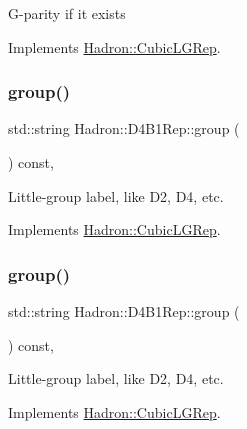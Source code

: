 G-\/parity if it exists 

Implements \mbox{\hyperlink{structHadron_1_1CubicLGRep_ace26f7b2d55e3a668a14cb9026da5231}{Hadron\+::\+Cubic\+L\+G\+Rep}}.

\mbox{\label{structHadron_1_1D4B1Rep_a030bc1e51b0cc790000a6ce72d132d06}} 
\subsubsection{\texorpdfstring{group()}{group()}\hspace{0.1cm}{\footnotesize\ttfamily [1/5]}}
{\footnotesize\ttfamily std\+::string Hadron\+::\+D4\+B1\+Rep\+::group (\begin{DoxyParamCaption}{ }\end{DoxyParamCaption}) const\hspace{0.3cm}{\ttfamily [inline]}, {\ttfamily [virtual]}}

Little-\/group label, like D2, D4, etc. 

Implements \mbox{\hyperlink{structHadron_1_1CubicLGRep_a9bdb14b519a611d21379ed96a3a9eb41}{Hadron\+::\+Cubic\+L\+G\+Rep}}.

\mbox{\label{structHadron_1_1D4B1Rep_a030bc1e51b0cc790000a6ce72d132d06}} 
\subsubsection{\texorpdfstring{group()}{group()}\hspace{0.1cm}{\footnotesize\ttfamily [2/5]}}
{\footnotesize\ttfamily std\+::string Hadron\+::\+D4\+B1\+Rep\+::group (\begin{DoxyParamCaption}{ }\end{DoxyParamCaption}) const\hspace{0.3cm}{\ttfamily [inline]}, {\ttfamily [virtual]}}

Little-\/group label, like D2, D4, etc. 

Implements \mbox{\hyperlink{structHadron_1_1CubicLGRep_a9bdb14b519a611d21379ed96a3a9eb41}{Hadron\+::\+Cubic\+L\+G\+Rep}}.

\mbox{\label{structHadron_1_1D4B1Rep_a030bc1e51b0cc790000a6ce72d132d06}} 
